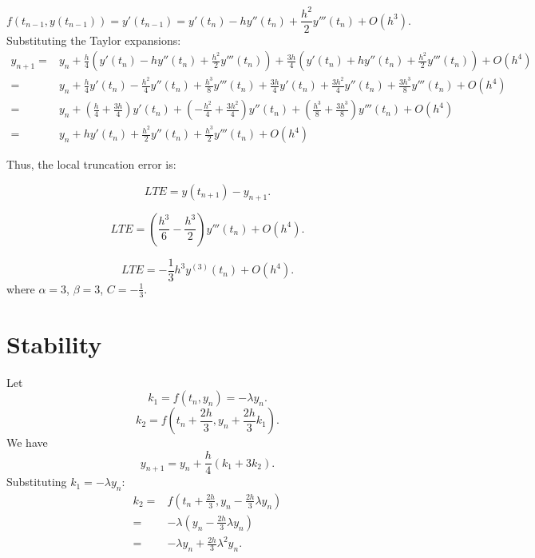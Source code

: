 \documentclass{article}
\begin{document}
$$
    f(t_{n-1}, y(t_{n-1})) = y'(t_{n-1}) = y'(t_n) - h y''(t_n) + \frac{h^2}{2} y'''(t_n) + O(h^3).
$$
Substituting the Taylor expansions:
\begin{align*}
    y_{n+1} = & y_n + \frac{h}{4} \left( y'(t_n) - h y''(t_n) + \frac{h^2}{2} y'''(t_n) \right)
    + \frac{3h}{4} \left( y'(t_n) + h y''(t_n) + \frac{h^2}{2} y'''(t_n) \right) + O(h^4)       \\
    =         & y_n + \frac{h}{4} y'(t_n) - \frac{h^2}{4} y''(t_n) + \frac{h^3}{8} y'''(t_n)
    + \frac{3h}{4} y'(t_n) + \frac{3h^2}{4} y''(t_n) + \frac{3h^3}{8} y'''(t_n) + O(h^4)        \\
    =         & y_n + \left( \frac{h}{4} + \frac{3h}{4} \right) y'(t_n)
    + \left( -\frac{h^2}{4} + \frac{3h^2}{4} \right) y''(t_n)
    + \left( \frac{h^3}{8} + \frac{3h^3}{8} \right) y'''(t_n) + O(h^4)                          \\
    =         & y_n + h y'(t_n) + \frac{h^2}{2} y''(t_n) + \frac{h^3}{2} y'''(t_n) + O(h^4)
\end{align*}

Thus, the local truncation error is:

$$
    LTE = y(t_{n+1}) - y_{n+1}.
$$

$$
    LTE = \left( \frac{h^3}{6} - \frac{h^3}{2} \right) y'''(t_n) + O(h^4).
$$

$$
    \boxed{LTE = -\frac{1}{3} h^3 y^{(3)}(t_n) + O(h^4)}.
$$
where $ \alpha = 3 $, $ \beta = 3 $, $ C = -\frac{1}{3} $.

\newpage
\section{Stability}
Let
$$
    k_1 = f(t_n, y_n) = -\lambda y_n.
$$
$$
    k_2 = f \left( t_n + \frac{2h}{3}, y_n + \frac{2h}{3} k_1 \right).
$$
We have
$$
    y_{n+1} = y_n + \frac{h}{4} \left( k_1 + 3 k_2 \right).
$$
Substituting \( k_1 = -\lambda y_n \):
\begin{align*}
    k_2 = & f \left( t_n + \frac{2h}{3}, y_n - \frac{2h}{3} \lambda y_n \right) \\
    =     & -\lambda \left( y_n - \frac{2h}{3} \lambda y_n \right)              \\
    =     & -\lambda y_n + \frac{2h}{3} \lambda^2 y_n.
\end{align*}
\end{document}
